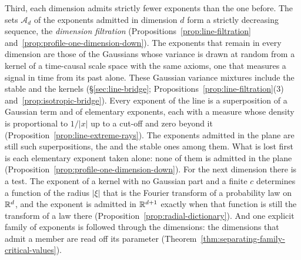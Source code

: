 Third, each dimension admits strictly fewer exponents than the one before. The sets
$\mathcal{A}_d$ of the exponents admitted in dimension $d$ form a strictly decreasing sequence,
the \emph{dimension filtration} (Propositions~\ref{prop:line-filtration}
and~\ref{prop:profile-one-dimension-down}). The exponents that remain in every dimension are
those of the Gaussians whose variance is drawn at random from a kernel of a time-causal scale
space with the same axioms, one that measures a signal in time from its past alone. These
Gaussian variance mixtures include the stable and the \Matern{} kernels
(\S\ref{sec:line-bridge};
Propositions~\ref{prop:line-filtration}(3) and~\ref{prop:isotropic-bridge}). Every exponent of
the line is a
superposition of a Gaussian term and of elementary exponents, each with a \Levy{} measure whose
density is proportional to $1/|x|$ up to a cut-off and zero beyond it
(Proposition~\ref{prop:line-extreme-rays}). The exponents admitted in the plane are still such
superpositions, the \Matern{} and the stable ones among them. What is lost first is each
elementary exponent taken alone: none of them is admitted in the plane
(Proposition~\ref{prop:profile-one-dimension-down}). For the next dimension there is a test.
The exponent of a kernel with no Gaussian part and a finite $c$ determines a function of the
radius $|\xi|$ that is the Fourier transform of a probability law on $\mathbb{R}^d$, and the exponent
is admitted in $\mathbb{R}^{d+1}$ exactly when that function is still the transform of a law there
(Proposition~\ref{prop:radial-dictionary}). And one explicit family of exponents is followed
through the dimensions: the dimensions that admit a member are read off its parameter
(Theorem~\ref{thm:separating-family-critical-values}).

